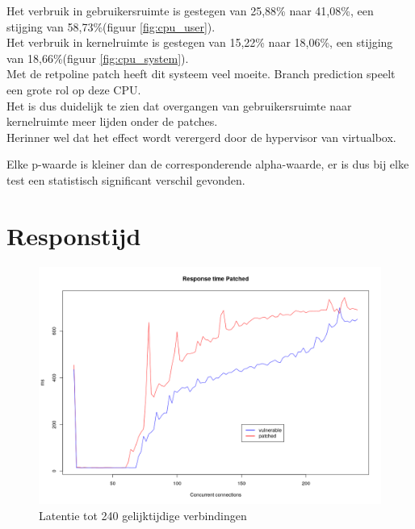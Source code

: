 Het verbruik in gebruikersruimte is gestegen van 25,88\% naar 41,08\%, een stijging van 58,73\%(figuur \ref{fig:cpu_user}).\\
Het verbruik in kernelruimte is gestegen van 15,22\% naar 18,06\%, een stijging van 18,66\%(figuur \ref{fig:cpu_system}).\\

Met de retpoline patch heeft dit systeem veel moeite. Branch prediction speelt een grote rol op deze CPU.\\

Het is dus duidelijk te zien dat overgangen van gebruikersruimte naar kernelruimte meer lijden onder de patches.\\
Herinner wel dat het effect wordt verergerd door de hypervisor van virtualbox.


Elke p-waarde is kleiner dan de corresponderende alpha-waarde, er is dus bij elke test een statistisch
significant verschil gevonden.







\section{Responstijd}

\begin{figure}
	\includegraphics[width=1.0\linewidth]{img/ms_conc.png}
	\caption{Latentie tot 240 gelijktijdige verbindingen}
	\label{fig:ms_conc}
\end{figure}

